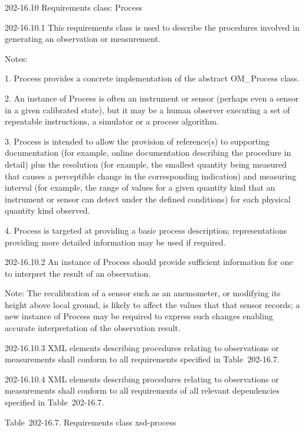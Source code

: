 202-16.10 Requirements class: Process

202-16.10.1 This requirements class is used to describe the procedures involved in generating an observation or measurement.

Notes:

1. Process provides a concrete implementation of the abstract OM\_Process class.

2. An instance of Process is often an instrument or sensor (perhaps even a sensor in a given calibrated state), but it may be a human observer executing a set of repeatable instructions, a simulator or a process algorithm.

3. Process is intended to allow the provision of reference(s) to supporting documentation (for example, online documentation describing the procedure in detail) plus the resolution (for example, the smallest quantity being measured that causes a perceptible change in the corresponding indication) and measuring interval (for example, the range of values for a given quantity kind that an instrument or sensor can detect under the defined conditions) for each physical quantity kind observed.

4. Process is targeted at providing a basic process description; representations providing more detailed information may be used if required.

202-16.10.2 An instance of Process should provide sufficient information for one to interpret the result of an observation.

Note: The recalibration of a sensor such as an anemometer, or modifying its height above local ground, is likely to affect the values that that sensor records; a new instance of Process may be required to express such changes enabling accurate interpretation of the observation result.

202-16.10.3 XML elements describing procedures relating to observations or measurements shall conform to all requirements specified in Table~202-16.7.

202-16.10.4 XML elements describing procedures relating to observations or measurements shall conform to all requirements of all relevant dependencies specified in Table~202-16.7.

Table~202-16.7. Requirements class xsd-process

